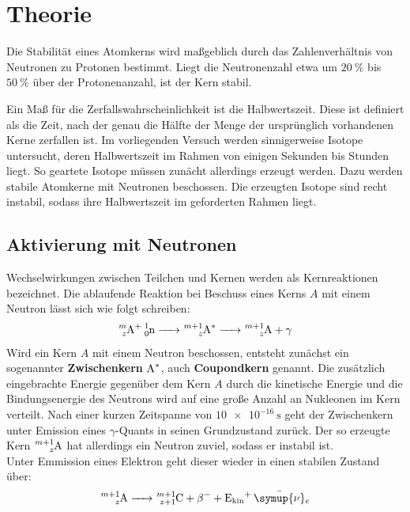 \section{Theorie}
\label{sec:Theorie}
Die Stabilität eines Atomkerns wird maßgeblich durch das Zahlenverhältnis von Neutronen zu Protonen bestimmt. Liegt die Neutronenzahl etwa um $\SI{20}{\percent}$ bis $\SI{50}{\percent}$ über der Protonenanzahl, ist der Kern stabil.

Ein Maß für die Zerfallswahrscheinlichkeit ist die Halbwertszeit. Diese ist definiert als die Zeit, nach der genau die Hälfte der Menge der ursprünglich vorhandenen Kerne zerfallen ist.
Im vorliegenden Versuch werden sinnigerweise Isotope untersucht, deren Halbwertszeit im Rahmen von einigen Sekunden bis Stunden liegt.
So geartete Isotope müssen zunächt allerdings erzeugt werden. Dazu werden stabile Atomkerne mit Neutronen beschossen. Die erzeugten Isotope sind recht instabil, sodass ihre Halbwertszeit im geforderten Rahmen liegt.


\subsection{Aktivierung mit Neutronen}
Wechselwirkungen zwischen Teilchen und Kernen werden als Kernreaktionen bezeichnet.
Die ablaufende Reaktion bei Beschuss eines Kerns $A$ mit einem Neutron lässt sich wie folgt schreiben:
\begin{align}
  \ce{^{m}_{z}A+ ^{1}_0n -> ^{m+1}_zA^{*} -> ^{m+1}_zA +\gamma}
\end{align}
Wird ein Kern $A$ mit einem Neutron beschossen, entsteht zunächst ein sogenannter \textbf{Zwischenkern} $\ce{A^{*}}$, auch \textbf{Coupondkern} genannt. Die zusätzlich eingebrachte Energie gegenüber dem Kern $A$ durch die kinetische Energie und die Bindungsenergie des Neutrons wird auf eine große Anzahl an Nukleonen im Kern verteilt.
Nach einer kurzen Zeitspanne von $\SI{10e-16}{\second}$ geht der Zwischenkern unter Emission eines $\gamma$-Quants in seinen Grundzustand zurück.
Der so erzeugte Kern $\ce{^{m+1}_zA }$ hat allerdings ein Neutron zuviel, sodass er instabil ist.\\
Unter Emmission eines Elektron geht dieser wieder in einen stabilen Zustand über:
\begin{align*}
\ce{^{m+1}_zA -> ^{m+1}_{z+1}C +\beta ^{-} + E_{\mathrm{kin }}+ \bar{\symup{\nu}}_e}
\end{align*}

